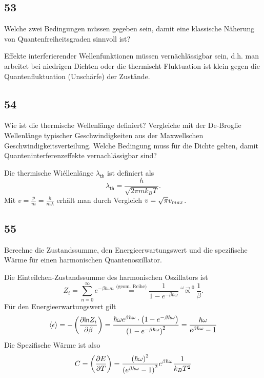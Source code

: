 \subsection{53}
\begin{myfrag}
Welche zwei Bedingungen müssen gegeben sein, damit eine klassische
Näherung von Quantenfreiheitsgraden sinnvoll ist?
\end{myfrag}
Effekte interferierender Wellenfunktionen müssen vernächlässigbar sein, d.h. man arbeitet bei niedrigen Dichten oder die thermischt Fluktuation ist klein gegen die Quantenfluktuation (Unschärfe) der Zustände.
\subsection{54}
\begin{myfrag}
Wie ist die thermische Wellenlänge definiert? Vergleiche mit der De-Broglie
Wellenlänge typischer Geschwindigkeiten aus der Maxwellschen
Geschwindigkeitsverteilung. Welche Bedingung muss für die Dichte gelten,
damit Quanteninterferenzeffekte vernachlässigbar sind?
\end{myfrag}
Die thermische Wiéllenlänge $\lambda_\mathsf{th}$ ist definiert als
\begin{equation}
	\lambda_\mathsf{th}=\frac{h}{\sqrt{2\pi mk_BT}}.
\end{equation}
Mit $v=\frac{p}{m}=\frac{h}{m\lambda}$ erhält man durch Vergleich $v=\sqrt{\pi}v_{max}$.
\subsection{55}
\begin{myfrag}
Berechne die Zustandssumme, den Energieerwartungswert und die
spezifische Wärme für einen harmonischen Quantenoszillator.
\end{myfrag}
Die Einteilchen-Zustandssumme des harmonischen Oszillators ist
\begin{equation}
	Z_i=\sum\limits_{n=0}^\infty e^{-\beta\hbar\omega n}\overset{\text{(geom. Reihe)}}=\frac{1}{1-e^{-\beta\hbar\omega}}\overset{\omega\rightarrow 0}\propto\frac{1}{\beta}\label{eq:1teil-quharmosz}.
\end{equation}
Für den Energieerwartungswert gilt
\begin{equation}
	\langle\epsilon\rangle=-\left(\frac{\partial \mathsf{ln} Z_i}{\partial \beta}\right)=\frac{\hbar\omega e^{\beta\hbar\omega}\cdot\left(1-e^{-\beta\hbar\omega}\right)}{\left(1-e^{-\beta\hbar\omega}\right)^2}=\frac{\hbar\omega}{e^{\beta\hbar\omega}-1}
\end{equation}
Die Spezifische Wärme ist also
\begin{equation}
	C=\left(\frac{\partial E}{\partial T}\right)=\frac{\left(\hbar\omega\right)^2}{\left(e^{\beta\hbar\omega}-1\right)^2}e^{\beta\hbar\omega}\frac{1}{k_BT^2}
\end{equation}
